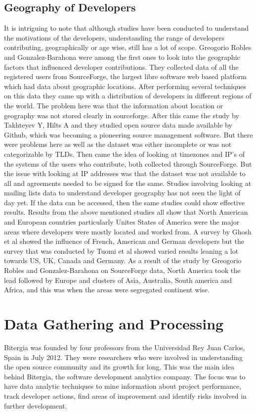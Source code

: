 \documentclass[seploa]{beavtex}
\begin{document}
\section{Geography of Developers}
It is intriguing to note that although studies have been conducted to understand the motivations of the developers, understanding the range of developers contributing, geographically or age wise, still has a lot of scope. Greogorio Robles and Gonzalez-Barahona were among the first ones to look into the geographic factors that influenced developer contributions. They collected data of all the registered users from SourceForge, the largest libre software web based platform which had data about geographic locations. After performing several techniques on this data they came up with a distribution of developers in different regions of the world\cite{robles2006}. The problem here was that the information about location or geography was not stored clearly in sourceforge. After this came the study by Takhteyev Y, Hilts A and they studied open source data made available by Github, which was becoming a pioneering source management software. But there were problems here as well as the dataset was either incomplete or was not categorizable by TLDs\cite{yuri2010}. Then came the idea of looking at timezones and IP's of the systems of the users who contribute, both collected through SourceForge. But the issue with looking at IP addresses was that the dataset was not available to all and agreements needed to be signed for the same\cite{von2010}. Studies involving looking at mailing lists data to understand developer geography has not seen the light of day yet. If the data can be accessed, then the same studies could show effective results. Results from the above mentioned studies all show that North American and European countries particularly Unites States of America were the major areas where developers were mostly located and worked from. A survey by Ghosh et al\cite{ghosh2005} showed the influence of French, American and German developers but the survey that was conducted by Tuomi et al\cite{tuomi2004} showed varied results leaning a lot towards US, UK, Canada and Germany. As a result of the study by Greogorio Robles and Gonzalez-Barahona on SourceForge data, North America took the lead followed by Europe and clusters of Asia, Australia, South america and Africa, and this was when the areas were segregated continent wise\cite{robles2006}.

\chapter{Data Gathering and Processing}
Bitergia was founded by four professors from the 	
Universidad Rey Juan Carlos, Spain in July 2012\cite{bit}. They were researchers who were involved in understanding the open source community and its growth for long. This was the main idea behind Bitergia, the software development analytics company. The focus was to have data analytic techniques to mine information about project performance, track developer actions, find areas of improvement and identify risks involved in further development. 
\end{document}
